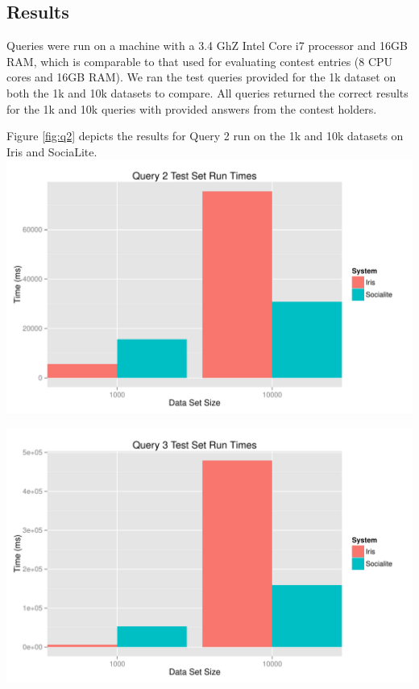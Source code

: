 \documentclass{article}
\begin{document}
\begin{multicols}{2}
\section{Results}
Queries were run on a machine with a 3.4 GhZ Intel Core i7 processor and 16GB RAM, which is comparable to that used for evaluating contest entries (8 CPU cores and 16GB RAM). We ran the test queries provided for the 1k dataset on both the 1k and 10k datasets to compare. All queries returned the correct results for the 1k and 10k queries with provided answers from the contest holders. 

Figure \ref{fig:q2} depicts the results for Query 2 run on the 1k and 10k datasets on Iris and SociaLite. 
\begingroup
    \centering
    \includegraphics[scale=0.4]{../results/query2.pdf}
    \label{fig:q2}
\endgroup

\begingroup
    \centering
    \includegraphics[scale=0.4]{../results/query3.pdf}
    \label{fig:q3}
\endgroup


\end{multicols}
\end{document}
